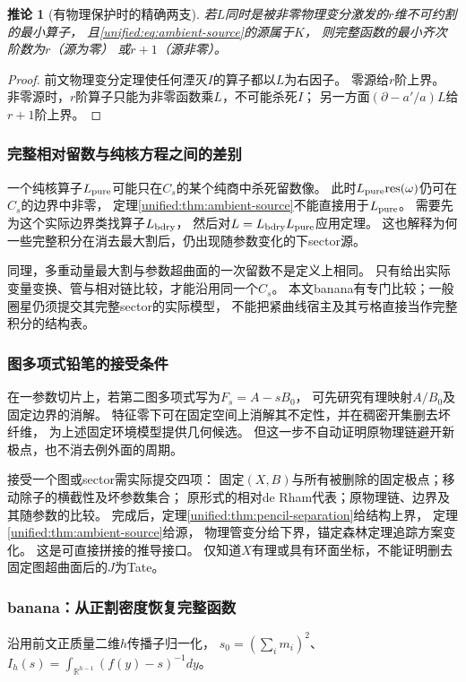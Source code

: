\documentclass[11pt,a4paper,oneside]{ctexart}
\theoremstyle{cnplain}
\newtheorem{corollary}[theorem]{推论}
\theoremstyle{definition}
\theoremstyle{remark}
\numberwithin{equation}{section}
\begin{document}
\begin{corollary}[有物理保护时的精确两支]\label{unified:cor:ambient-exact}
若$L$同时是被非零物理变分激发的$r$维不可约割的最小算子，
且\eqref{unified:eq:ambient-source}的源属于$K$，
则完整函数的最小齐次阶数为$r$（源为零）
或$r+1$（源非零）。
\end{corollary}
\begin{proof}
前文物理变分定理使任何湮灭$I$的算子都以$L$为右因子。
零源给$r$阶上界。
非零源时，$r$阶算子只能为非零函数乘$L$，不可能杀死$I$；
另一方面$(\partial-a'/a)L$给$r+1$阶上界。
\end{proof}

\subsubsection{完整相对留数与纯核方程之间的差别}
一个纯核算子$L_{\rm pure}$可能只在$C_s$的某个纯商中杀死留数像。
此时$L_{\rm pure}\mathrm{res}(\omega)$仍可在$C_s$的边界中非零，
定理\ref{unified:thm:ambient-source}不能直接用于$L_{\rm pure}$。
需要先为这个实际边界类找算子$L_{\rm bdry}$，
然后对$L=L_{\rm bdry}L_{\rm pure}$应用定理。
这也解释为何一些完整积分在消去最大割后，仍出现随参数变化的下sector源。

同理，多重动量最大割与参数超曲面的一次留数不是定义上相同。
只有给出实际变量变换、管与相对链比较，才能沿用同一个$C_s$。
本文banana有专门比较；一般圈星仍须提交其完整sector的实际模型，
不能把紧曲线宿主及其亏格直接当作完整积分的结构表。

\subsubsection{图多项式铅笔的接受条件}
在一参数切片上，若第二图多项式写为$F_s=A-sB_0$，
可先研究有理映射$A/B_0$及固定边界的消解。
特征零下可在固定空间上消解其不定性，并在稠密开集删去坏纤维，
为上述固定环境模型提供几何候选。
但这一步不自动证明原物理链避开新极点，也不消去例外面的周期。

接受一个图或sector需实际提交四项：
固定$(X,B)$与所有被删除的固定极点；移动除子的横截性及坏参数集合；
原形式的相对de Rham代表；原物理链、边界及其随参数的比较。
完成后，定理\ref{unified:thm:pencil-separation}给结构上界，
定理\ref{unified:thm:ambient-source}给源，
物理管变分给下界，锚定森林定理追踪方案变化。
这是可直接拼接的推导接口。
仅知道$X$有理或具有环面坐标，不能证明删去固定图超曲面后的$J$为Tate。

\subsubsection{banana：从正割密度恢复完整函数}
沿用前文正质量二维$h$传播子归一化，
$s_0=(\sum_i m_i)^2$、$I_h(s)=\int_{\mathbb R^{h-1}}(f(y)-s)^{-1}dy$。
\end{document}

